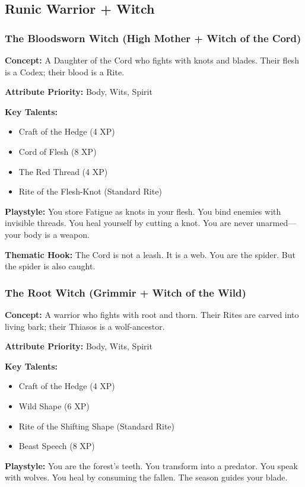 \subsection{Runic Warrior + Witch}

\subsubsection{The Bloodsworn Witch (High Mother + Witch of the Cord)}

\textbf{Concept:} A Daughter of the Cord who fights with knots and blades. Their flesh is a Codex; their blood is a Rite.

\textbf{Attribute Priority:} Body, Wits, Spirit

\textbf{Key Talents:}
\begin{itemize}
\item Craft of the Hedge (4 XP)
\item Cord of Flesh (8 XP)
\item The Red Thread (4 XP)
\item Rite of the Flesh-Knot (Standard Rite)
\end{itemize}

\textbf{Playstyle:} You store Fatigue as knots in your flesh. You bind enemies with invisible threads. You heal yourself by cutting a knot. You are never unarmed—your body is a weapon.

\textbf{Thematic Hook:} The Cord is not a leash. It is a web. You are the spider. But the spider is also caught.

\subsubsection{The Root Witch (Grimmir + Witch of the Wild)}

\textbf{Concept:} A warrior who fights with root and thorn. Their Rites are carved into living bark; their Thiasos is a wolf-ancestor.

\textbf{Attribute Priority:} Body, Wits, Spirit

\textbf{Key Talents:}
\begin{itemize}
\item Craft of the Hedge (4 XP)
\item Wild Shape (6 XP)
\item Rite of the Shifting Shape (Standard Rite)
\item Beast Speech (8 XP)
\end{itemize}

\textbf{Playstyle:} You are the forest's teeth. You transform into a predator. You speak with wolves. You heal by consuming the fallen. The season guides your blade.

